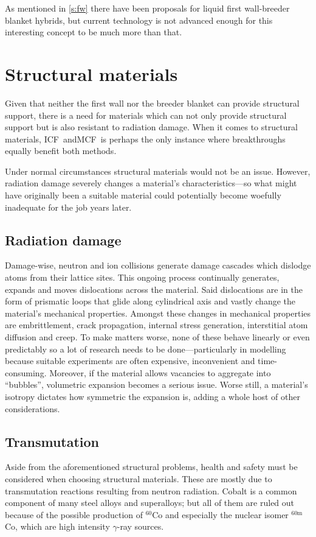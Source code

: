 \documentclass[12pt, a4paper]{article}
\newcommand{\mc}{MCF}
\newcommand{\ic}{ICF}
\begin{document}
		As mentioned in \cref{s:fw} there have been proposals for liquid first wall-breeder blanket hybrids, but current technology is not advanced enough for this interesting concept to be much more than that.
	\section{Structural materials}
		Given that neither the first wall nor the breeder blanket can provide structural support, there is a need for materials which can not only provide structural support but is also resistant to radiation damage. When it comes to structural materials, \ic~and\mc~is perhaps the only instance where breakthroughs equally benefit both methods.
		
		Under normal circumstances structural materials would not be an issue. However, radiation damage severely changes a material's characteristics---so what might have originally been a suitable material could potentially become woefully inadequate for the job years later. 
		\subsection{Radiation damage}
			Damage-wise, neutron and ion collisions generate damage cascades which dislodge atoms from their lattice sites. This ongoing process continually generates, expands and moves dislocations across the material. Said dislocations are in the form of prismatic loops that glide along cylindrical axis and vastly change the material's mechanical properties. Amongst these changes in mechanical properties are embrittlement, crack propagation, internal stress generation, interstitial atom diffusion and creep. To make matters worse, none of these behave linearly or even predictably so a lot of research needs to be done---particularly in modelling because suitable experiments are often expensive, inconvenient and time-consuming. Moreover, if the material allows vacancies to aggregate into ``bubbles'', volumetric expansion becomes a serious issue. Worse still, a material's isotropy dictates how symmetric the expansion is, adding a whole host of other considerations.
		\subsection{Transmutation}
			Aside from the aforementioned structural problems, health and safety must be considered when choosing structural materials. These are mostly due to transmutation reactions resulting from neutron radiation. Cobalt is a common component of many steel alloys and superalloys; but all of them are ruled out because of the possible production of $^{60}$Co and especially the nuclear isomer $^{60\textrm{m}}$Co, which are high intensity $\gamma$-ray sources.
\end{document}
